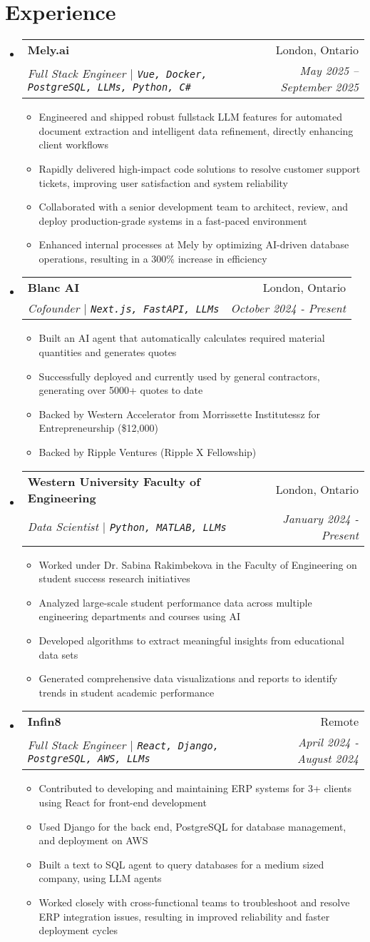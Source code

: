 \documentclass[letterpaper,10pt]{article}
\makeatletter
\newcommand{\resumeItem}[1]{
  \item\small{
    {#1 \vspace{-2pt}}
  }
}
\newcommand{\resumeSubheading}[4]{
  \vspace{-2pt}\item
    \begin{tabular*}{0.97\textwidth}[t]{l@{\extracolsep{\fill}}r}
      \textbf{#1} & #2 \\
      \textit{\small#3} & \textit{\small #4} \\
    \end{tabular*}\vspace{-7pt}
}
\newcommand{\resumeSubHeadingListStart}{\begin{itemize}[leftmargin=0.15in, label={}]}
\newcommand{\resumeSubHeadingListEnd}{\end{itemize}}
\newcommand{\resumeItemListStart}{\begin{itemize}}
\newcommand{\resumeItemListEnd}{\end{itemize}\vspace{-5pt}}
\makeatother
\begin{document}
\section{Experience}
\resumeSubHeadingListStart
  \resumeSubheading
    {Mely.ai}{London, Ontario}
    {Full Stack Engineer $|$ \textup{\texttt{Vue, Docker, PostgreSQL, LLMs, Python, C\#}}}{May 2025 -- September 2025}
    \resumeItemListStart
      \resumeItem{Engineered and shipped robust fullstack LLM features for automated document extraction and intelligent data refinement, directly enhancing client workflows}
      \resumeItem{Rapidly delivered high-impact code solutions to resolve customer support tickets, improving user satisfaction and system reliability}
      \resumeItem{Collaborated with a senior development team to architect, review, and deploy production-grade systems in a fast-paced environment}
      \resumeItem{Enhanced internal processes at Mely by optimizing AI-driven database operations, resulting in a 300\% increase in efficiency}
    \resumeItemListEnd
  \resumeSubheading
    {Blanc AI}{London, Ontario}
    {Cofounder $|$ \textup{\texttt{Next.js, FastAPI, LLMs}}}{October 2024 - Present}
    \resumeItemListStart
      \resumeItem{Built an AI agent that automatically calculates required material quantities and generates quotes}
      \resumeItem{Successfully deployed and currently used by general contractors, generating over 5000+ quotes to date}
      \resumeItem{Backed by Western Accelerator from Morrissette Institutessz for Entrepreneurship (\$12,000)}
      \resumeItem{Backed by Ripple Ventures (Ripple X Fellowship)}
    \resumeItemListEnd
  
  \resumeSubheading
    {Western University Faculty of Engineering}{London, Ontario}
    {Data Scientist $|$ \textup{\texttt{Python, MATLAB, LLMs}}}{January 2024 - Present}
    \resumeItemListStart
      \resumeItem{Worked under Dr. Sabina Rakimbekova in the Faculty of Engineering on student success research initiatives}
      \resumeItem{Analyzed large-scale student performance data across multiple engineering departments and courses using AI}
      \resumeItem{Developed algorithms to extract meaningful insights from educational data sets}
      \resumeItem{Generated comprehensive data visualizations and reports to identify trends in student academic performance}
    \resumeItemListEnd

  \resumeSubheading
    {Infin8}{Remote}
    {Full Stack Engineer $|$ \textup{\texttt{React, Django, PostgreSQL, AWS, LLMs}}}{April 2024 - August 2024}
    \resumeItemListStart
      \resumeItem{Contributed to developing and maintaining ERP systems for 3+ clients using React for front-end development}
      \resumeItem{Used Django for the back end, PostgreSQL for database management, and deployment on AWS}
      \resumeItem{Built a text to SQL agent to query databases for a medium sized company, using LLM agents}
      \resumeItem{Worked closely with cross-functional teams to troubleshoot and resolve ERP integration issues, resulting in improved reliability and faster deployment cycles}
    \resumeItemListEnd
\resumeSubHeadingListEnd
\end{document}
